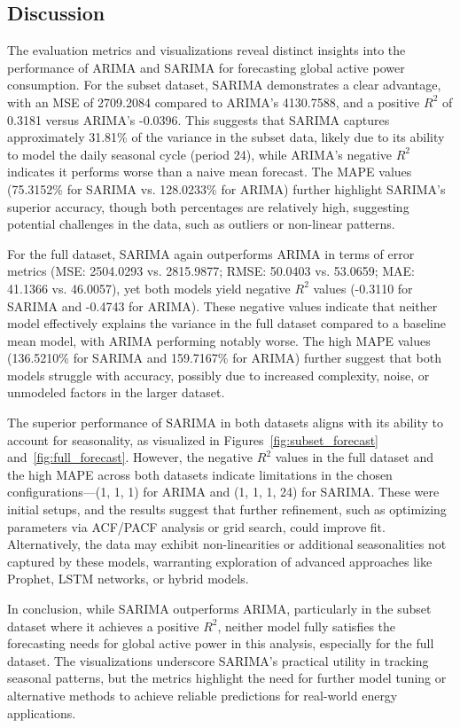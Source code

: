 	\subsection{Discussion}
	
	The evaluation metrics and visualizations reveal distinct insights into the performance of ARIMA and SARIMA for forecasting global active power consumption. For the subset dataset, SARIMA demonstrates a clear advantage, with an MSE of 2709.2084 compared to ARIMA’s 4130.7588, and a positive $R^2$ of 0.3181 versus ARIMA’s -0.0396. This suggests that SARIMA captures approximately 31.81\% of the variance in the subset data, likely due to its ability to model the daily seasonal cycle (period 24), while ARIMA’s negative $R^2$ indicates it performs worse than a naive mean forecast. The MAPE values (75.3152\% for SARIMA vs. 128.0233\% for ARIMA) further highlight SARIMA’s superior accuracy, though both percentages are relatively high, suggesting potential challenges in the data, such as outliers or non-linear patterns.
	
	For the full dataset, SARIMA again outperforms ARIMA in terms of error metrics (MSE: 2504.0293 vs. 2815.9877; RMSE: 50.0403 vs. 53.0659; MAE: 41.1366 vs. 46.0057), yet both models yield negative $R^2$ values (-0.3110 for SARIMA and -0.4743 for ARIMA). These negative values indicate that neither model effectively explains the variance in the full dataset compared to a baseline mean model, with ARIMA performing notably worse. The high MAPE values (136.5210\% for SARIMA and 159.7167\% for ARIMA) further suggest that both models struggle with accuracy, possibly due to increased complexity, noise, or unmodeled factors in the larger dataset.
	
	The superior performance of SARIMA in both datasets aligns with its ability to account for seasonality, as visualized in Figures~\ref{fig:subset_forecast} and~\ref{fig:full_forecast}. However, the negative $R^2$ values in the full dataset and the high MAPE across both datasets indicate limitations in the chosen configurations—(1, 1, 1) for ARIMA and (1, 1, 1, 24) for SARIMA. These were initial setups, and the results suggest that further refinement, such as optimizing parameters via ACF/PACF analysis or grid search, could improve fit. Alternatively, the data may exhibit non-linearities or additional seasonalities not captured by these models, warranting exploration of advanced approaches like Prophet, LSTM networks, or hybrid models.
	
	In conclusion, while SARIMA outperforms ARIMA, particularly in the subset dataset where it achieves a positive $R^2$, neither model fully satisfies the forecasting needs for global active power in this analysis, especially for the full dataset. The visualizations underscore SARIMA’s practical utility in tracking seasonal patterns, but the metrics highlight the need for further model tuning or alternative methods to achieve reliable predictions for real-world energy applications.
	
